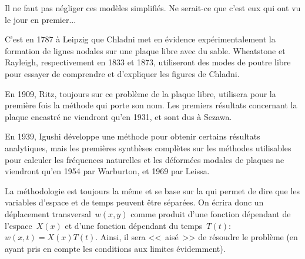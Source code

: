 \begin{histoire}
Il ne faut pas négliger ces modèles simplifiés. Ne serait-ce que c'est eux qui ont vu le jour en premier...

\medskip
C'est en 1787 à Leipzig que Chladni 
met en évidence expérimentalement la formation de lignes nodales sur une plaque libre avec du sable.
Wheatstone 
et Rayleigh, 
respectivement en 1833 et 1873, utiliseront des modes de poutre libre pour essayer
de comprendre et d'expliquer les figures de Chladni.

En 1909, Ritz, toujours sur ce problème de la plaque libre, utilisera pour 
la première fois la méthode qui porte son nom.
Les premiers résultats concernant la plaque encastré ne viendront qu'en 1931, et sont dus à Sezawa.

En 1939, Igushi développe une méthode pour obtenir certains résultats analytiques, mais les premières
synthèses complètes sur les méthodes utilisables pour calculer les fréquences naturelles et les déformées
modales de plaques ne viendront qu'en 1954 par Warburton, et 1969 par 
Leissa.
\end{histoire}

\medskip
La méthodologie est toujours la même et se base sur la  qui
permet de dire que les variables d'espace et de temps peuvent être séparées.
On écrira donc un déplacement transversal~$w(x,y)$ comme produit d'une fonction dépendant de l'espace~$X(x)$ et
d'une fonction dépendant du temps~$T(t)$:~$w(x,t)=X(x)T(t)$.
Ainsi, il sera <<~aisé~>> de résoudre le problème (en ayant pris en compte les conditions aux limites évidemment).

